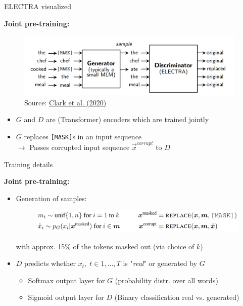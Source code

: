\begin{frame}{ELECTRA visualized}
	
\vfill

	\textbf{Joint pre-training:}
	
	\begin{figure}
		\centering
		\includegraphics[width = 11cm]{figure/electra.png}\\ 
		\footnotesize{Source:} \href{https://arxiv.org/pdf/2003.10555.pdf}{\footnotesize Clark et al. (2020)}
	\end{figure}	
	
	\begin{itemize}
		\item $G$ and $D$ are (Transformer) encoders which are trained jointly
		\item $G$ replaces \texttt{[MASK]}s in an input sequence\\
					$\rightarrow$ Passes corrupted input sequence $\vec{x}^{corrupt}$ to $D$	
	\end{itemize}

\vfill

\end{frame}


\begin{frame}{Training details}

\vfill

	\textbf{Joint pre-training:}

	\begin{itemize}
		\item Generation of samples:
	\begin{figure}
		\centering
		\includegraphics[width = 11cm]{figure/electra-samples.png}
	\end{figure}\vspace{-.25cm}
		{\footnotesize with approx. 15\% of the tokens masked out (via choice of $k$)}
		\item $D$ predicts whether $x_t,\; t \in 1, \hdots, T$ is "\textit{real}" or generated by $G$
			\begin{itemize}
				\item Softmax output layer for $G$ (probability distr. over all words)
				\item Sigmoid output layer for $D$ (Binary classification real vs. generated)
			\end{itemize}
	\end{itemize}
	
\vfill

\end{frame}

